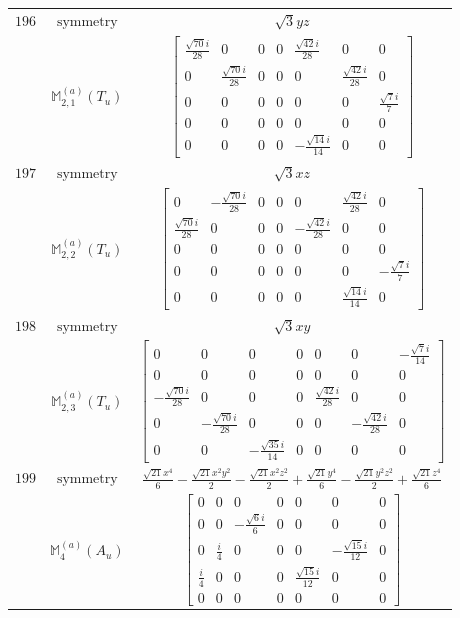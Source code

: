 \documentclass[fleqn,8pt,landscape]{jsarticle}
\begin{document}
\begin{longtable}{ccc}
$ 196 $ & $ \text{symmetry} $ & $ \sqrt{3} y z $ \\
$  $ & $ \mathbb{M}_{2,1}^{(a)}(T_{u}) $ & $ \begin{bmatrix} \frac{\sqrt{70} i}{28} & 0 & 0 & 0 & \frac{\sqrt{42} i}{28} & 0 & 0 \\ 0 & \frac{\sqrt{70} i}{28} & 0 & 0 & 0 & \frac{\sqrt{42} i}{28} & 0 \\ 0 & 0 & 0 & 0 & 0 & 0 & \frac{\sqrt{7} i}{7} \\ 0 & 0 & 0 & 0 & 0 & 0 & 0 \\ 0 & 0 & 0 & 0 & - \frac{\sqrt{14} i}{14} & 0 & 0 \end{bmatrix} $ \\ \hline
$ 197 $ & $ \text{symmetry} $ & $ \sqrt{3} x z $ \\
$  $ & $ \mathbb{M}_{2,2}^{(a)}(T_{u}) $ & $ \begin{bmatrix} 0 & - \frac{\sqrt{70} i}{28} & 0 & 0 & 0 & \frac{\sqrt{42} i}{28} & 0 \\ \frac{\sqrt{70} i}{28} & 0 & 0 & 0 & - \frac{\sqrt{42} i}{28} & 0 & 0 \\ 0 & 0 & 0 & 0 & 0 & 0 & 0 \\ 0 & 0 & 0 & 0 & 0 & 0 & - \frac{\sqrt{7} i}{7} \\ 0 & 0 & 0 & 0 & 0 & \frac{\sqrt{14} i}{14} & 0 \end{bmatrix} $ \\ \hline
$ 198 $ & $ \text{symmetry} $ & $ \sqrt{3} x y $ \\
$  $ & $ \mathbb{M}_{2,3}^{(a)}(T_{u}) $ & $ \begin{bmatrix} 0 & 0 & 0 & 0 & 0 & 0 & - \frac{\sqrt{7} i}{14} \\ 0 & 0 & 0 & 0 & 0 & 0 & 0 \\ - \frac{\sqrt{70} i}{28} & 0 & 0 & 0 & \frac{\sqrt{42} i}{28} & 0 & 0 \\ 0 & - \frac{\sqrt{70} i}{28} & 0 & 0 & 0 & - \frac{\sqrt{42} i}{28} & 0 \\ 0 & 0 & - \frac{\sqrt{35} i}{14} & 0 & 0 & 0 & 0 \end{bmatrix} $ \\ \hline
$ 199 $ & $ \text{symmetry} $ & $ \frac{\sqrt{21} x^{4}}{6} - \frac{\sqrt{21} x^{2} y^{2}}{2} - \frac{\sqrt{21} x^{2} z^{2}}{2} + \frac{\sqrt{21} y^{4}}{6} - \frac{\sqrt{21} y^{2} z^{2}}{2} + \frac{\sqrt{21} z^{4}}{6} $ \\
$  $ & $ \mathbb{M}_{4}^{(a)}(A_{u}) $ & $ \begin{bmatrix} 0 & 0 & 0 & 0 & 0 & 0 & 0 \\ 0 & 0 & - \frac{\sqrt{6} i}{6} & 0 & 0 & 0 & 0 \\ 0 & \frac{i}{4} & 0 & 0 & 0 & - \frac{\sqrt{15} i}{12} & 0 \\ \frac{i}{4} & 0 & 0 & 0 & \frac{\sqrt{15} i}{12} & 0 & 0 \\ 0 & 0 & 0 & 0 & 0 & 0 & 0 \end{bmatrix} $ \\ \hline

\end{longtable}
\end{document}
